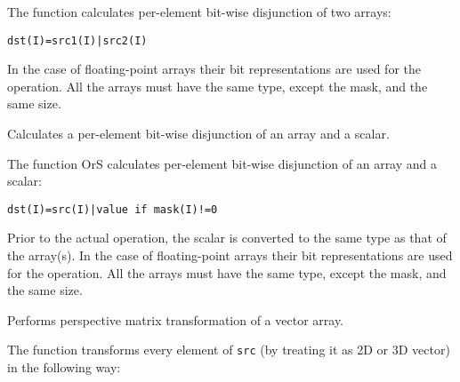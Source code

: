The function calculates per-element bit-wise disjunction of two arrays:

\begin{lstlisting}
dst(I)=src1(I)|src2(I)
\end{lstlisting}

In the case of floating-point arrays their bit representations are used for the operation. All the arrays must have the same type, except the mask, and the same size.

Calculates a per-element bit-wise disjunction of an array and a scalar.


\begin{description}
\end{description}


The function OrS calculates per-element bit-wise disjunction of an array and a scalar:

\begin{lstlisting}
dst(I)=src(I)|value if mask(I)!=0
\end{lstlisting}

Prior to the actual operation, the scalar is converted to the same type as that of the array(s). In the case of floating-point arrays their bit representations are used for the operation. All the arrays must have the same type, except the mask, and the same size.


Performs perspective matrix transformation of a vector array.


\begin{description}
\end{description}


The function transforms every element of \texttt{src} (by treating it as 2D or 3D vector) in the following way:

